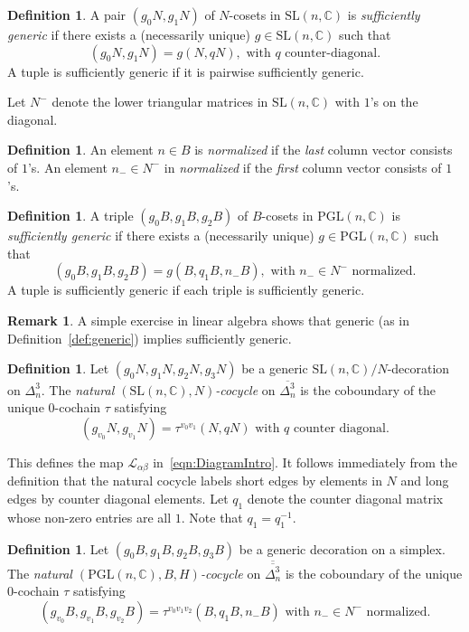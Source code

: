 \documentclass[12pt]{amsart}
\theoremstyle{definition}
\newtheorem{definition}[theorem]{Definition}
\newtheorem{remark}[theorem]{Remark}
\numberwithin{equation}{section}
\def\SL{\mathrm{SL}}
\def\PGL{\mathrm{PGL}}
\def\C{\mathbb{C}}
\begin{document}
\begin{definition} A pair $(g_0N,g_1N)$ of $N$-cosets in $\SL(n,\C)$ is \emph{sufficiently generic} if there exists  a (necessarily unique) $g\in\SL(n,\C)$ such that
\begin{equation}
(g_0N,g_1N)=g(N,qN), \text{ with $q$ counter-diagonal}.
\end{equation}
A tuple is sufficiently generic if it is pairwise sufficiently generic.
\end{definition}
Let $N^-$ denote the lower triangular matrices in $\SL(n,\C)$ with $1$'s on the diagonal.
\begin{definition}
An element $n\in B$ is \emph{normalized} if the \emph{last} column vector consists of $1$'s. An element $n_-\in N^-$ in \emph{normalized} if the \emph{first} column vector consists of $1$'s.
\end{definition}
\begin{definition}
A triple $(g_0B,g_1B,g_2B)$ of $B$-cosets in $\PGL(n,\C)$ is \emph{sufficiently generic} if there exists a (necessarily unique) $g\in\PGL(n,\C)$ such that
\begin{equation}
(g_0B,g_1B,g_2B)=g(B,q_1B,n_-B), \text{ with $n_-\in N^-$ normalized}.
\end{equation}
A tuple is sufficiently generic if each triple is sufficiently generic.
\end{definition}

\begin{remark} A simple exercise in linear algebra shows that generic (as in Definition~\ref{def:generic}) implies sufficiently generic. 
\end{remark}


\begin{definition}\label{def:NaturalSLCocycle}
Let $(g_0N,g_1N,g_2N,g_3N)$ be a generic $\SL(n,\C)/N$-decoration on $\Delta^3_n$. The \emph{natural $(\SL(n,\C),N)$-cocycle} on $\overline{\Delta^3_n}$ is the coboundary of the unique $0$-cochain $\tau$  satisfying
\begin{equation}
(g_{v_0}N,g_{v_1}N)=\tau^{v_0v_1}(N,qN) \text{ with $q$ counter diagonal}.
\end{equation}
\end{definition} 
This defines the map $\mathcal L_{\alpha\beta}$ in~\eqref{eqn:DiagramIntro}. It follows immediately from the definition that the natural cocycle labels short edges by elements in $N$ and long edges by counter diagonal elements. 
Let $q_1$ denote the counter diagonal matrix whose non-zero entries are all $1$. Note that $q_1=q_1^{-1}$.
\begin{definition}\label{def:NaturalPGLCocycle}
Let $(g_0B,g_1B,g_2B,g_3B)$ be a generic decoration on a simplex. The \emph{natural $(\PGL(n,\C),B,H)$-cocycle} on $\overline{\overline{\Delta^3_n}}$ is the coboundary of the unique $0$-cochain $\tau$ satisfying
\begin{equation}
(g_{v_0}B,g_{v_1}B,g_{v_2}B)=\tau^{v_0v_1v_2}(B,q_1B,n_-B) \text{ with $n_-\in N^- $ normalized}.
\end{equation}
\end{definition} 
\end{document}
